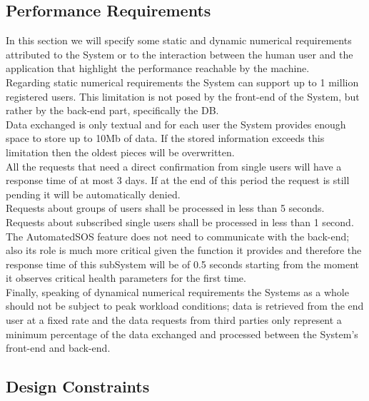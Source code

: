 \documentclass[titlepage]{article}
\begin{document}
		
		\subsection{Performance Requirements}
		In this section we will specify some static and dynamic numerical requirements attributed to the System or to the 	interaction between the human user and the application that highlight the performance reachable by the machine. \\
	Regarding static numerical requirements the System can support up to 1 million registered users. This limitation is not 	posed by the front-end of the System, but rather by the back-end part, specifically the DB.\\
	Data exchanged is only textual and for each user the System provides enough space to store up to 10Mb of data. If the 	stored information exceeds this limitation then the oldest pieces will be overwritten.\\
	All the requests that need  a direct confirmation from single users will have a response time of at most 3 days. If at the 	end of this period the request is still pending it will be automatically denied.\\
	Requests about groups of users shall be processed in less than 5 seconds.\\
	Requests about subscribed single users shall be processed in less than 1 second.\\
	The AutomatedSOS feature does not need to communicate with the back-end; also its role is much more critical given 	the function it provides and therefore the response time of this subSystem will be of 0.5 seconds starting from the 		moment it observes critical health parameters for the first time.\\
	Finally, speaking of dynamical numerical requirements the Systems as a whole should not be subject to peak workload 	conditions; data is retrieved from the end user at a fixed rate and the data requests from third parties only represent a 	minimum percentage of the data exchanged and processed between the System’s front-end and back-end.\\
	
		\subsection{Design Constraints}
		
\end{document}
